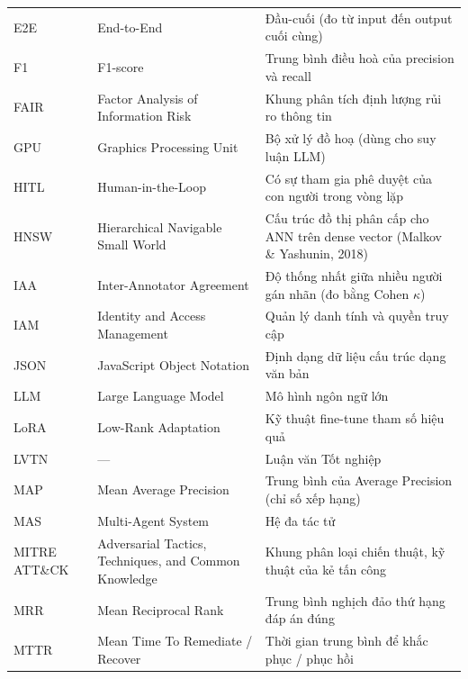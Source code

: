 \begin{longtable}{p{2.2cm} p{5.6cm} p{6.4cm}}
  E2E     & End-to-End                                                & Đầu-cuối (đo từ input đến output cuối cùng) \\
  F1      & F1-score                                                  & Trung bình điều hoà của precision và recall \\
  FAIR    & Factor Analysis of Information Risk                       & Khung phân tích định lượng rủi ro thông tin \\
  GPU     & Graphics Processing Unit                                  & Bộ xử lý đồ hoạ (dùng cho suy luận LLM) \\
  HITL    & Human-in-the-Loop                                         & Có sự tham gia phê duyệt của con người trong vòng lặp \\
  HNSW    & Hierarchical Navigable Small World                        & Cấu trúc đồ thị phân cấp cho ANN trên dense vector (Malkov \& Yashunin, 2018) \\
  IAA     & Inter-Annotator Agreement                                 & Độ thống nhất giữa nhiều người gán nhãn (đo bằng Cohen $\kappa$) \\
  IAM     & Identity and Access Management                            & Quản lý danh tính và quyền truy cập \\
  JSON    & JavaScript Object Notation                                & Định dạng dữ liệu cấu trúc dạng văn bản \\
  LLM     & Large Language Model                                      & Mô hình ngôn ngữ lớn \\
  LoRA    & Low-Rank Adaptation                                       & Kỹ thuật fine-tune tham số hiệu quả \\
  LVTN    & ---                                                       & Luận văn Tốt nghiệp \\
  MAP     & Mean Average Precision                                    & Trung bình của Average Precision (chỉ số xếp hạng) \\
  MAS     & Multi-Agent System                                        & Hệ đa tác tử \\
  MITRE ATT\&CK & Adversarial Tactics, Techniques, and Common Knowledge & Khung phân loại chiến thuật, kỹ thuật của kẻ tấn công \\
  MRR     & Mean Reciprocal Rank                                      & Trung bình nghịch đảo thứ hạng đáp án đúng \\
  MTTR    & Mean Time To Remediate / Recover                          & Thời gian trung bình để khắc phục / phục hồi \\

\end{longtable}
